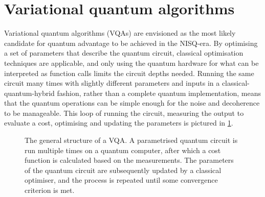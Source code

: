 \section{Variational quantum algorithms}
\label{sec:vqa}
Variational quantum algorithms (VQAs) are envisioned as the most likely candidate for quantum advantage to be achieved in the NISQ-era.
By optimising a set of parameters that describe the quantum circuit, classical optimisation techniques are applicable, and only using the quantum hardware for what can be interpreted as function calls limits the circuit depths needed.
Running the same circuit many times with slightly different parameters and inputs in a classical-quantum-hybrid fashion, rather than a complete quantum implementation, means that the quantum operations can be simple enough for the noise and decoherence to be manageable.
This loop of running the circuit, measuring the output to evaluate a cost, optimising and updating the parameters is pictured in \cref{fig:vqa}.

\begin{figure}
    \centering
    \caption{
        The general structure of a VQA.
        A parametrised quantum circuit is run multiple times on a quantum computer, after which a cost function is calculated based on the measurements.
        The parameters of the quantum circuit are subsequently updated by a classical optimiser, and the process is repeated until some convergence criterion is met.
    }
    \label{fig:vqa}
\end{figure}


